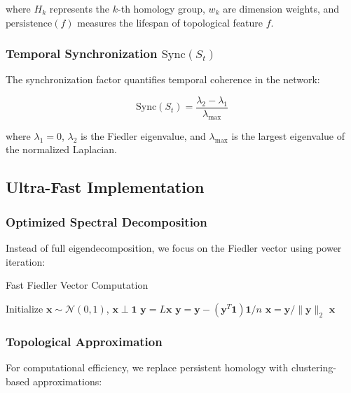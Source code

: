 \documentclass[conference]{IEEEtran}
\begin{document}
where $H_k$ represents the $k$-th homology group, $w_k$ are dimension weights, and $\text{persistence}(f)$ measures the lifespan of topological feature $f$.

\subsubsection{Temporal Synchronization $\text{Sync}(S_t)$}

The synchronization factor quantifies temporal coherence in the network:

\begin{equation}
\text{Sync}(S_t) = \frac{\lambda_2 - \lambda_1}{\lambda_{\max}}
\label{eq:synchronization}
\end{equation}

where $\lambda_1 = 0$, $\lambda_2$ is the Fiedler eigenvalue, and $\lambda_{\max}$ is the largest eigenvalue of the normalized Laplacian.

\subsection{Ultra-Fast Implementation}

\subsubsection{Optimized Spectral Decomposition}

Instead of full eigendecomposition, we focus on the Fiedler vector using power iteration:

\begin{algorithm}
\caption{Fast Fiedler Vector Computation}
\begin{algorithmic}[1]
\STATE Initialize $\mathbf{x} \sim \mathcal{N}(0,1)$, $\mathbf{x} \perp \mathbf{1}$
    \STATE $\mathbf{y} = L\mathbf{x}$
    \STATE $\mathbf{y} = \mathbf{y} - (\mathbf{y}^T \mathbf{1})\mathbf{1} / n$
    \STATE $\mathbf{x} = \mathbf{y} / \|\mathbf{y}\|_2$
\ENDFOR
\RETURN $\mathbf{x}$
\end{algorithmic}
\end{algorithm}

\subsubsection{Topological Approximation}

For computational efficiency, we replace persistent homology with clustering-based approximations:
\end{document}
